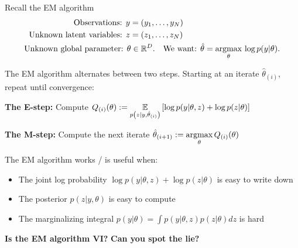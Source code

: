 



\begin{frame}{Recall the EM algorithm}
%
\vspace{-1em}
%
\begin{align*}
    \textrm{Observations: }y ={}& (y_1, \ldots, y_N)\\
    \textrm{Unknown latent variables: }z ={}& (z_1, \ldots, z_N)\\
    \textrm{Unknown global parameter: }\theta \in{}& \mathbb{R}^D.
    \quad \textrm{We want: } \hat\theta ={}
    \underset{\theta}{\mathrm{argmax}}\, \log p(y | \theta) .
\end{align*}

\hrulefill

The EM algorithm alternates between two steps.  Starting at an iterate
$\hat\theta_{(i)}$, repeat until convergence:

\textbf{The E-step:}  Compute $Q_{(i)}(\theta) := \underset{p\left(z | y, \hat\theta_{(i)} \right)}{\mathbb{E}}\left[\log p(y | \theta, z) + \log p(z | \theta)\right]$

\textbf{The M-step:}  Compute the next iterate $\hat\theta_{(i + 1)} := \underset{\theta}{\mathrm{argmax}}\, Q_{(i)}(\theta)$

\hrulefill

The EM algorithm works / is useful when:

\begin{itemize}
    \item The joint log probability $\log p(y | \theta, z) + \log p(z | \theta)$ is easy to write down
    \item The posterior $p(z | y, \theta)$ is easy to compute
    \item The marginalizing integral $p(y | \theta) = \int p(y | \theta, z) p(z | \theta) dz$ is hard
\end{itemize}


\hrulefill
\begin{center}
\textbf{Is the EM algorithm VI?} \hspace{5em}\textbf{Can you spot the lie?}
\end{center}

\end{frame}





